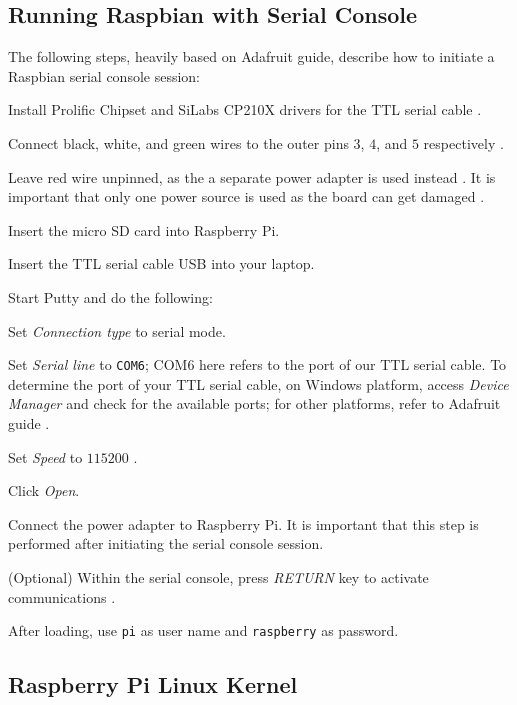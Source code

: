 \documentclass[onecolumn, draftclsnofoot, 10pt, compsoc]{IEEEtran}
\begin{document}
\subsection{Running Raspbian with Serial Console} \label{rasp_setup}
The following steps, heavily based on Adafruit guide, describe how to initiate a Raspbian serial console session:
\begin{description}
\item Install Prolific Chipset and SiLabs CP210X drivers for the TTL serial cable \cite{adafruit2}.
\item Connect black, white, and green wires to the outer pins $3$, $4$, and $5$ respectively \cite{adafruit1}.
\item Leave red wire unpinned, as the a separate power adapter is used instead \cite{adafruit1}. It is important that only one power source is used as the board can get damaged \cite{adafruit1}.
\item Insert the micro SD card into Raspberry Pi.
\item Insert the TTL serial cable USB into your laptop.
\item Start Putty and do the following:
\begin{description}
\item Set \textit{Connection type} to serial mode.
\item Set \textit{Serial line} to \texttt{COM6}; {COM6} here refers to the port of our TTL serial cable. To determine the port of your TTL serial cable, on Windows platform, access \textit{Device Manager} and check for the available ports; for other platforms, refer to Adafruit guide \cite{adafruit1}.
\item Set \textit{Speed} to $115200$ \cite{adafruit1}.
\item Click \textit{Open}.
\end{description}
\item Connect the power adapter to Raspberry Pi. It is important that this step is performed after initiating the serial console session.
\item (Optional) Within the serial console, press \textit{RETURN} key to activate communications \cite{adafruit1}.
\item After loading, use \texttt{pi} as user name and \texttt{raspberry} as password.
\end{description}


\subsection{Raspberry Pi Linux Kernel}
\end{document}
